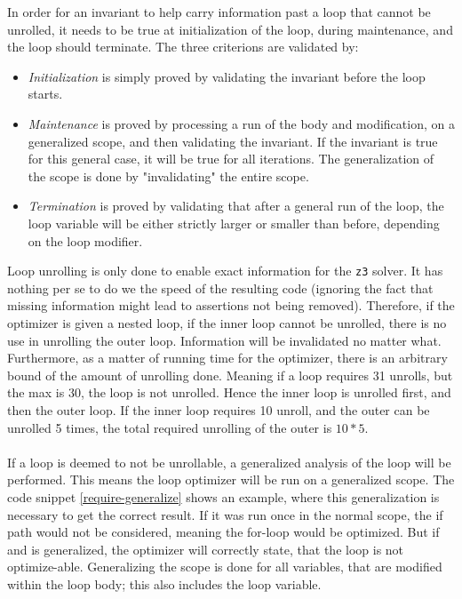 In order for an invariant to help carry information past a loop that cannot be unrolled, it needs
to be true at initialization of the loop, during maintenance, and the loop should terminate.
The three criterions are validated by:
\begin{itemize}
    \item \emph{Initialization} is simply proved by validating the invariant before the loop starts.

    \item \emph{Maintenance} is proved by processing a run of the body and modification, on a
          generalized scope, and then validating the invariant. If the invariant is true for this
          general case, it will be true for all iterations. The generalization of the scope is
          done by "invalidating" the entire scope.

    \item \emph{Termination} is proved by validating that after a general run of the loop,
          the loop variable will be either strictly larger or smaller than before, depending
          on the loop modifier.
\end{itemize}
\noindent
Loop unrolling is only done to enable exact information for the \texttt{z3} solver. It has nothing
per se to do we the speed of the resulting code (ignoring the fact that missing information
might lead to assertions not being removed). Therefore, if the optimizer is given a nested loop,
if the inner loop cannot be unrolled, there is no use in unrolling the outer loop. Information will
be invalidated no matter what. Furthermore, as a matter of running time for the optimizer, there
is an arbitrary bound of the amount of unrolling done. Meaning if a loop requires 31 unrolls, but
the max is 30, the loop is not unrolled. Hence the inner loop is unrolled first, and then the outer
loop. If the inner loop requires 10 unroll, and the outer can be unrolled 5 times, the total
required unrolling of the outer is $10*5$.
\\
\\
If a loop is deemed to not be unrollable, a generalized analysis of the loop will be performed.
This means the loop optimizer will be run on a generalized scope. The code snippet
\ref{require-generalize} shows an example, where this generalization is necessary to get the
correct result. If it was run once in the normal scope, the if path would not be considered,
meaning the for-loop would be optimized. But if  and  is generalized, the
optimizer will correctly state, that the loop is not optimize-able.
Generalizing the scope is done for all variables, that are modified within the loop body;
this also includes the loop variable.

